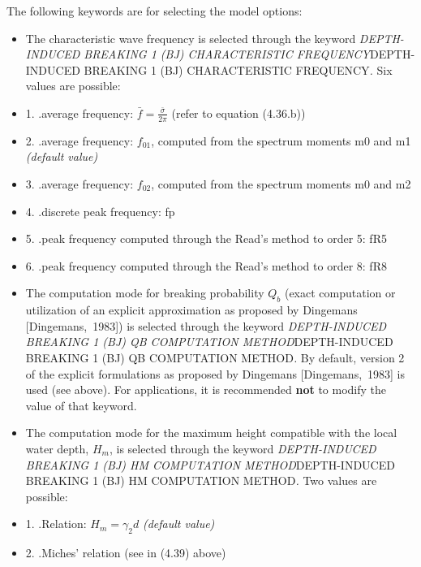  The following keywords are for selecting the model options:

 \begin{itemize}
\item The characteristic wave frequency is selected through the keyword \textit{DEPTH-INDUCED BREAKING 1 (BJ) CHARACTERISTIC FREQUENCY}DEPTH-INDUCED BREAKING 1 (BJ) CHARACTERISTIC FREQUENCY\textit{. }Six values are possible:\textit{}

 \item 1. .average frequency: $\bar{f}=\frac{\bar{\sigma }}{2\pi } $  (refer to equation (4.36.b))

 \item 2. .average frequency: $f_{01} $, computed from the spectrum moments m0 and m1 \textit{(default value)}

 \item 3. .average frequency: $f_{02} $, computed from the spectrum moments m0 and m2

 \item 4. .discrete peak frequency: fp

 \item 5. .peak frequency computed through the Read's method to order 5: fR5

 \item 6. .peak frequency computed through the Read's method to order 8: fR8

 \item The computation mode for breaking probability $Q_{b} $ (exact computation or utilization of an explicit approximation as proposed by Dingemans [Dingemans,~1983]) is selected through the keyword \textit{DEPTH-INDUCED BREAKING 1 (BJ) QB COMPUTATION METHOD}DEPTH-INDUCED BREAKING 1 (BJ) QB COMPUTATION METHOD\textit{.} By default,\textit{ }version 2 of the explicit formulations as proposed by Dingemans [Dingemans,~1983] is used (see above). For applications, it is recommended \textbf{not} to modify the value of that keyword.

 \item The computation mode for the maximum height compatible with the local water depth, $H_{m} $, is selected through the keyword \textit{DEPTH-INDUCED BREAKING 1 (BJ) HM COMPUTATION METHOD}DEPTH-INDUCED BREAKING 1 (BJ) HM COMPUTATION METHOD\textit{. }Two values are possible:\textit{}

 \item 1. .Relation: $H_{m} =\gamma _{2} d$  \textit{(default value)}

 \item 2. .Miches' relation (see in (4.39) above)
\end{itemize}

